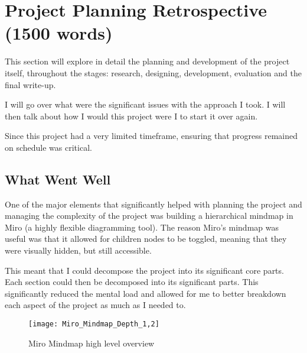 \chapter{Project Planning Retrospective (1500 words)}
This section will explore in detail the planning and development of the project itself, throughout the stages: research, designing, development, evaluation and the final write-up.

I will go over what were the significant issues with the approach I took. I will then talk about how I would this project were I to start it over again.%

Since this project had a very limited timeframe, ensuring that progress remained on schedule was critical. %

\section{What Went Well}
One of the major elements that significantly helped with planning the project and managing the complexity of the project was building a hierarchical mindmap in Miro (a highly flexible diagramming tool). The reason Miro's mindmap was useful was that it allowed for children nodes to be toggled, meaning that they were visually hidden, but still accessible.

This meant that I could decompose the project into its significant core parts. Each section could then be decomposed into its significant parts. This significantly reduced the mental load and allowed for me to better breakdown each aspect of the project as much as I needed to.
\begin{figure}
    \texttt{[image: Miro\_Mindmap\_Depth\_1,2]}
    \caption{Miro Mindmap high level overview}
\end{figure}


